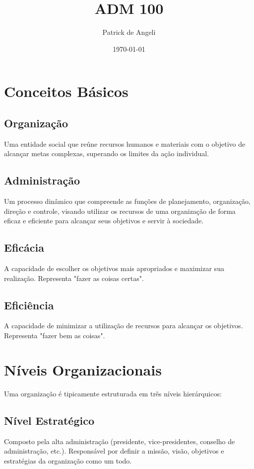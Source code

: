 \documentclass{article}
\title{ADM 100} %
\author{Patrick de Angeli} %
\date{\today} %
\begin{document}
\maketitle
\newpage %

\tableofcontents %
\newpage %


\section{Conceitos Básicos}

\subsection{Organização}
Uma entidade social que reúne recursos humanos e materiais com o objetivo de alcançar metas complexas, superando os limites da ação individual.

\subsection{Administração}
Um processo dinâmico que compreende as funções de planejamento, organização, direção e controle, visando utilizar os recursos de uma organização de forma eficaz e eficiente para alcançar seus objetivos e servir à sociedade.

\subsection{Eficácia}
A capacidade de escolher os objetivos mais apropriados e maximizar sua realização. Representa "fazer as coisas certas".

\subsection{Eficiência}
A capacidade de minimizar a utilização de recursos para alcançar os objetivos. Representa "fazer bem as coisas".

\section{Níveis Organizacionais}

Uma organização é tipicamente estruturada em três níveis hierárquicos:

\subsection{Nível Estratégico}
Composto pela alta administração (presidente, vice-presidentes, conselho de administração, etc.). Responsável por definir a missão, visão, objetivos e estratégias da organização como um todo.
\end{document}
